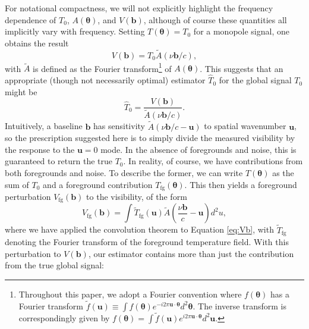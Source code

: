 \documentclass[twocolumn,apj,numberedappendix]{emulateapj}
\newcommand{\mep}[1]{}
\begin{document}
For notational compactness, we will not explicitly highlight the frequency dependence of $T_0$, $A(\boldsymbol{\theta})$, and $V(\mathbf{b})$, although of course these quantities all implicitly vary with frequency. Setting $T(\boldsymbol \theta) = T_0$ for a monopole signal, one obtains the result
\begin{equation}
\label{eq:blMonoResponse}
V(\mathbf{b}) = T_0 \widetilde{A} \left( \nu \mathbf{b} / c \right),
\end{equation}
with $\widetilde{A}$ is defined as the Fourier transform\footnote{Throughout this paper, we adopt a Fourier convention where $f(\boldsymbol \theta)$ has a Fourier transform $\widetilde{f}(\mathbf{u}) \equiv \int f(\boldsymbol \theta) e^{-i 2 \pi \mathbf{u} \cdot \boldsymbol \theta  } d^2 \boldsymbol \theta.$ The inverse transform is correspondingly given by $f(\boldsymbol \theta) = \int \widetilde{f}(\mathbf{u}) e^{i 2 \pi \mathbf{u} \cdot \boldsymbol \theta  }d^2 \mathbf{u}.$ \mep{make sure this stays with rest}} of $A(\boldsymbol \theta)$. This suggests that an appropriate (though not necessarily optimal) estimator $\widehat{T}_0$ for the global signal $T_0$ might be
\begin{equation}
\label{eq:singleBlSillyEst}
\widehat{T}_0 = \frac{V( \mathbf{b})}{\widetilde{A} \left( \nu \mathbf{b} / c \right)}.
\end{equation}
Intuitively, a baseline $\mathbf{b}$ has sensitivity $\widetilde{A} \left( \nu \mathbf{b} / c - \mathbf{u} \right)$ to spatial wavenumber $\mathbf{u}$, so the prescription suggested here is to simply divide the measured visibility by the response to the $\mathbf{u}=0$ mode. In the absence of foregrounds and noise, this is guaranteed to return the true $T_0$.  In reality, of course, we have contributions from both foregrounds and noise.  To describe the former, we can write $T(\boldsymbol \theta)$ as the sum of $T_0$ and a foreground contribution $T_\textrm{fg} (\boldsymbol \theta)$.  This then yields a foreground perturbation $V_\textrm{fg} (\mathbf{b})$ to the visibility, of the form
\begin{equation}
V_\textrm{fg} (\mathbf{b}) = \int  \widetilde{T}_\textrm{fg} (\mathbf{u}) \widetilde{A} \left( \frac{\nu \mathbf{b}}{c} - \mathbf{u} \right) d^2 u,
\end{equation}
where we have applied the convolution theorem to Equation \eqref{eq:Vb}, with $\widetilde{T}_\textrm{fg}$ denoting the Fourier transform of the foreground temperature field.  With this perturbation to $V(\mathbf{b})$, our estimator contains more than just the contribution from the true global signal:
\end{document}

